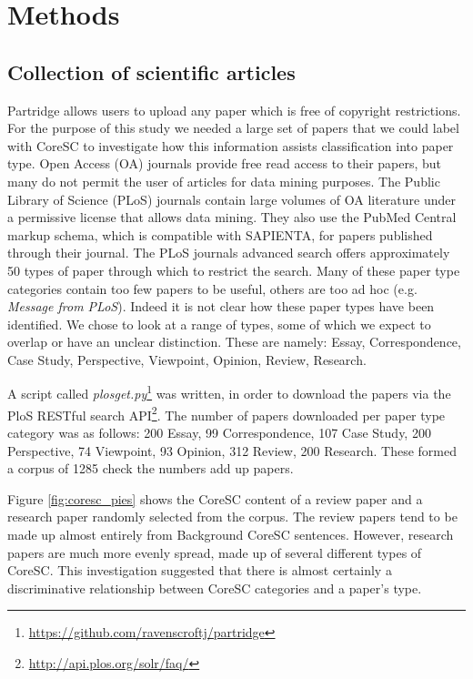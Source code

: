 \documentclass{svmult}
\begin{document}
\section{Methods}
\label{sec:2}

\subsection{Collection of scientific articles} 
Partridge allows users to upload any paper which is free of copyright
restrictions.  For the purpose of this study we needed a large set of papers
that we could label with CoreSC to investigate how this information assists
classification into paper type.  Open Access (OA) journals provide free read
access to their papers, but many do not permit the user of articles for data
mining purposes. The Public Library of Science (PLoS) journals contain large
volumes of OA literature under a permissive license that allows data mining.
They also use the PubMed Central markup schema, which is compatible with
SAPIENTA, for papers published through their journal. The PLoS journals
advanced search offers approximately 50 types of paper through which to
restrict the search.  Many of these paper type categories contain too few
papers to be useful, others are too ad hoc (e.g.  {\it Message from PLoS}).
Indeed it is not clear how these paper types have been identified. We chose to
look at a range of types, some of which we expect to overlap or have an unclear
distinction.  These are namely: Essay, Correspondence, Case Study, Perspective,
Viewpoint, Opinion, Review, Research. 

A script called {\em plosget.py}\footnote{\url{https://github.com/ravenscroftj/partridge}} was written, in order to download the
papers via the PloS RESTful search API\footnote{\url{http://api.plos.org/solr/faq/}}. The number of papers downloaded per
paper type category was as follows: 200 Essay, 99 Correspondence, 107 Case
Study, 200 Perspective, 74 Viewpoint, 93 Opinion, 312 Review, 200 Research.
These formed a corpus of 1285 %
check the numbers add up papers.

Figure \ref{fig:coresc_pies} shows the CoreSC content of a review paper and a
research paper randomly selected from the corpus.  The review papers tend to be
made up almost entirely from Background CoreSC sentences.  However, research
papers are much more evenly spread, made up of several different types of
CoreSC.  This investigation suggested that there is almost certainly a
discriminative relationship between CoreSC categories and a paper's type. 
\end{document}
